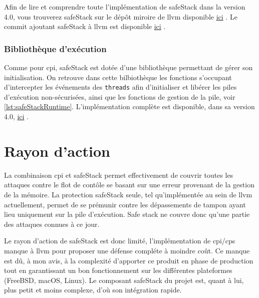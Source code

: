 Afin de lire et comprendre toute l'implémentation de \og \gls{safeStack} \fg dans la version 4.0, vous trouverez \og \gls{safeStack} \fg sur le dépôt miroire de \gls{llvm} disponible \href{https://github.com/llvm-mirror/llvm/blob/release_40/lib/CodeGen/SafeStack.cpp}{ici} \cite{SafeStackImpl}. Le commit ajoutant \og \gls{safeStack} \fg à \gls{llvm} est disponible \href{https://github.com/llvm-mirror/llvm/commit/7ffec838a2b72e6841d9fb993b5fe6a45f3b2a90#diff-0ae4221c82094c2703f2511b921530e0}{ici} \cite{SafeStackCommitImpl}.

\subsubsection{Bibliothèque d'exécution}

Comme pour \gls{cpi}, \og \gls{safeStack} \fg est dotée d'une bibliothèque permettant de gérer son initialisation. On retrouve dans cette bilbiothèque les fonctions s'occupant d'intercepter les événements des \texttt{threads} afin d'initialiser et libérer les piles d'exécution non-sécurisées, ainsi que les fonctions de gestion de la pile, voir \autoref{lst:safeStackRuntime}. L'implémentation complète est disponible, dans sa version 4.0, \href{https://github.com/llvm-mirror/compiler-rt/blob/release_40/lib/safestack/safestack.cc}{ici} \cite{SafeStackRTImpl}.


\section{Rayon d'action}

La combinaison \gls{cpi} et \og \gls{safeStack} \fg permet effectivement de couvrir toutes les attaques contre le flot de contôle se basant sur une erreur provenant de la gestion de la mémoire. La protection \og \gls{safeStack} \fg seule, tel qu'implémentée au sein de \gls{llvm} actuellement, permet de se prémunir contre les dépassements de tampon ayant lieu uniquement sur la pile d'exécution. \og Safe stack \fg ne couvre donc qu'une partie des attaques connues à ce jour.

Le rayon d'action de \og \gls{safeStack} \fg est donc limité, l'implémentation de \gls{cpi}/\gls{cps} manque à \gls{llvm} pour proposer une défense compléte à moindre coût. Ce manque est dû, à mon avis, à la complexité d'apporter ce produit en phase de production tout en garantissant un bon fonctionnement sur les différentes plateformes (FreeBSD, macOS, Linux). Le composant \og \gls{safeStack} \fg du projet est, quant à lui, plus petit et moins complexe, d'où son intégration rapide.

